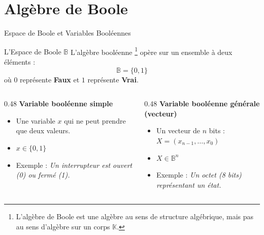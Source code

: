 

\section{Algèbre de Boole}

\begin{frame}{Espace de Boole et Variables Booléennes}

    \begin{block}{L'Espace de Boole \(\mathbb{B}\)}
        L'algèbre booléenne \footnote{L’algèbre de Boole est une algèbre au sens de structure algébrique, mais pas au sens d’algèbre sur un corps $\mathbb{K}$.} opère sur un ensemble à deux éléments :
        \[
            \mathbb{B} = \{0, 1\}
        \]
        où \(0\) représente \textbf{Faux} et \(1\) représente \textbf{Vrai}.
    \end{block}

    \vspace{0.4cm}

    \begin{columns}[T]
        \begin{column}{0.48\textwidth}
            \textbf{Variable booléenne simple}
            \begin{itemize}
                \item Une variable \(x\) qui ne peut prendre que deux valeurs.
                \item \(x \in \{0, 1\}\)
                \item Exemple : \textit{Un interrupteur est ouvert (0) ou fermé (1).}
            \end{itemize}
        \end{column}
        \begin{column}{0.48\textwidth}
            \textbf{Variable booléenne générale (vecteur)}
            \begin{itemize}
                \item Un vecteur de \(n\) bits : \(X = (x_{n-1}, \dots, x_0)\)
                \item \(X \in \mathbb{B}^n\)
                \item Exemple : \textit{Un octet (8 bits) représentant un état.}
            \end{itemize}
        \end{column}
    \end{columns}

\end{frame}

